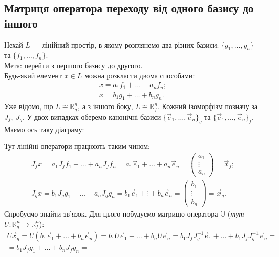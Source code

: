 \documentclass{math_library}
\begin{document}
\subsection{Матриця оператора переходу від одного базису до іншого}
Нехай $L$ --- лінійний простір, в якому розглянемо два різних базиси: $\{g_1,
\dots,g_n\}$ та $\{f_1,\dots,f_n\}$. \\
Мета: перейти з першого базису до другого.\\
Будь-який елемент $x \in L$ можна розкласти двома способами:
\begin{align*}
x = a_1 f_1 + \dots + a_n f_n; \\
x = b_1 g_1 + \dots + b_n g_n.
\end{align*}
Уже відомо, що $L \cong \mathbb{R}^n_g$, а з іншого боку, $L \cong \mathbb{R}^n_f$. Кожний ізоморфізм позначу за $J_f,\ J_g$. У двох випадках оберемо канонічні базиси $\{\vec{e}_1,\dots, \vec{e}_n\}_g$ та $\{\vec{e}_1,\dots, \vec{e}_n\}_f$. Маємо ось таку діаграму:
\begin{center}
\end{center}
Тут лінійні оператори працюють таким чином:
\begin{align*}
J_f x = a_1 J_f f_1 + \dots + a_n J_f f_n = a_1 \vec{e}_1 + \dots + a_n \vec{e}_n = \begin{pmatrix}
a_1 \\ \vdots \\ a_n
\end{pmatrix} = \vec{x}_f; \\
J_g x = b_1 J_g g_1 + \dots + a_n J_g g_n = b_1 \vec{e}_1 + \vdots + b_n \vec{e}_n = \begin{pmatrix}
b_1 \\ \vdots \\ b_n
\end{pmatrix} = \vec{x}_g.
\end{align*}
Спробуємо знайти зв'язок. Для цього побудуємо матрицю оператора $\mathbb{U}$ (\textit{тут $U \colon \mathbb{R}^n_g \to \mathbb{R}^n_f$}):
\begin{align*}
U \vec{x}_g = U(b_1 \vec{e}_1 + \dots + b_n \vec{e}_n) = b_1 U\vec{e}_1 + \dots + b_n U\vec{e}_n = b_1 J_f J_g^{-1} \vec{e}_1 + \dots + b_1 J_f J_g^{-1} \vec{e}_n = \\ = b_1 J_f g_1 + \dots + b_n J_f g_n \boxed{=}
\end{align*}
\end{document}
